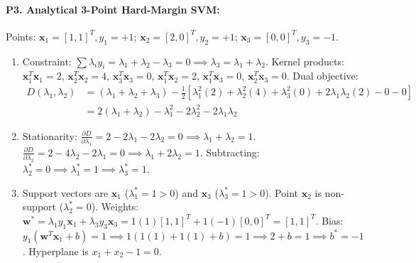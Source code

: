 \paragraph{P3. Analytical 3-Point Hard-Margin SVM:}
Points: $\mathbf{x}_1 = [1, 1]^T, y_1 = +1$; $\mathbf{x}_2 = [2, 0]^T, y_2 = +1$; $\mathbf{x}_3 = [0, 0]^T, y_3 = -1$.
\begin{enumerate}[label=(\alph*)]
    \item Constraint: $\sum \lambda_i y_i = \lambda_1 + \lambda_2 - \lambda_3 = 0 \implies \lambda_3 = \lambda_1 + \lambda_2$.
    Kernel products: $\mathbf{x}_1^T \mathbf{x}_1 = 2$, $\mathbf{x}_2^T \mathbf{x}_2 = 4$, $\mathbf{x}_3^T \mathbf{x}_3 = 0$, $\mathbf{x}_1^T \mathbf{x}_2 = 2$, $\mathbf{x}_1^T \mathbf{x}_3 = 0$, $\mathbf{x}_2^T \mathbf{x}_3 = 0$.
    Dual objective:
    \begin{align*}
    D(\lambda_1, \lambda_2) &= (\lambda_1 + \lambda_2 + \lambda_3) - \frac{1}{2}\left[ \lambda_1^2 (2) + \lambda_2^2 (4) + \lambda_3^2 (0) + 2\lambda_1 \lambda_2 (2) - 0 - 0 \right] \\
    &= 2(\lambda_1 + \lambda_2) - \lambda_1^2 - 2\lambda_2^2 - 2\lambda_1 \lambda_2
    \end{align*}
    \item Stationarity: $\frac{\partial D}{\partial \lambda_1} = 2 - 2\lambda_1 - 2\lambda_2 = 0 \implies \lambda_1 + \lambda_2 = 1$.
    $\frac{\partial D}{\partial \lambda_2} = 2 - 4\lambda_2 - 2\lambda_1 = 0 \implies \lambda_1 + 2\lambda_2 = 1$.
    Subtracting: $\lambda_2^* = 0 \implies \lambda_1^* = 1 \implies \lambda_3^* = 1$.
    \item Support vectors are $\mathbf{x}_1$ ($\lambda_1^* = 1 > 0$) and $\mathbf{x}_3$ ($\lambda_3^* = 1 > 0$). Point $\mathbf{x}_2$ is non-support ($\lambda_2^* = 0$).
    Weights: $\mathbf{w}^* = \lambda_1 y_1 \mathbf{x}_1 + \lambda_3 y_3 \mathbf{x}_3 = 1(1)[1, 1]^T + 1(-1)[0, 0]^T = [1, 1]^T$.
    Bias: $y_1(\mathbf{w}^T \mathbf{x}_1 + b) = 1 \implies 1(1(1) + 1(1) + b) = 1 \implies 2 + b = 1 \implies b^* = -1$.
    Hyperplane is $x_1 + x_2 - 1 = 0$.
\end{enumerate}

